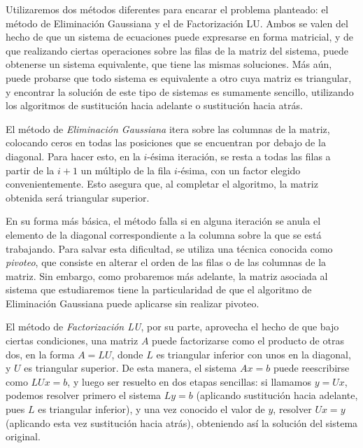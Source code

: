   Utilizaremos dos métodos diferentes para encarar el problema planteado: el método de Eliminación Gaussiana y el de Factorización LU. Ambos se valen del hecho de que un sistema de ecuaciones puede expresarse en forma matricial, y de que realizando ciertas operaciones sobre las filas de la matriz del sistema, puede obtenerse un sistema equivalente, que tiene las mismas soluciones. Más aún, puede probarse que todo sistema es equivalente a otro cuya matriz es triangular, y encontrar la solución de este tipo de sistemas es sumamente sencillo, utilizando los algoritmos de sustitución hacia adelante o sustitución hacia atrás.

  El método de \emph{Eliminación Gaussiana} itera sobre las columnas de la matriz, colocando ceros en todas las posiciones que se encuentran por debajo de la diagonal. Para hacer esto, en la $i$-ésima iteración, se resta a todas las filas a partir de la $i + 1$ un múltiplo de la fila $i$-ésima, con un factor elegido convenientemente. Esto asegura que, al completar el algoritmo, la matriz obtenida será triangular superior.

  En su forma más básica, el método falla si en alguna iteración se anula el elemento de la diagonal correspondiente a la columna sobre la que se está trabajando. Para salvar esta dificultad, se utiliza una técnica conocida como \emph{pivoteo}, que consiste en alterar el orden de las filas o de las columnas de la matriz. Sin embargo, como probaremos más adelante, la matriz asociada al sistema que estudiaremos tiene la particularidad de que el algoritmo de Eliminación Gaussiana puede aplicarse sin realizar pivoteo.

  El método de \emph{Factorización LU}, por su parte, aprovecha el hecho de que bajo ciertas condiciones, una matriz $A$ puede factorizarse como el producto de otras dos, en la forma $A = LU$, donde $L$ es triangular inferior con unos en la diagonal, y $U$ es triangular superior. De esta manera, el sistema $Ax=b$ puede reescribirse como $LUx=b$, y luego ser resuelto en dos etapas sencillas: si llamamos $y=Ux$, podemos resolver primero el sistema $Ly=b$ (aplicando sustitución hacia adelante, pues $L$ es triangular inferior), y una vez conocido el valor de $y$, resolver $Ux=y$ (aplicando esta vez sustitución hacia atrás), obteniendo así la solución del sistema original.
